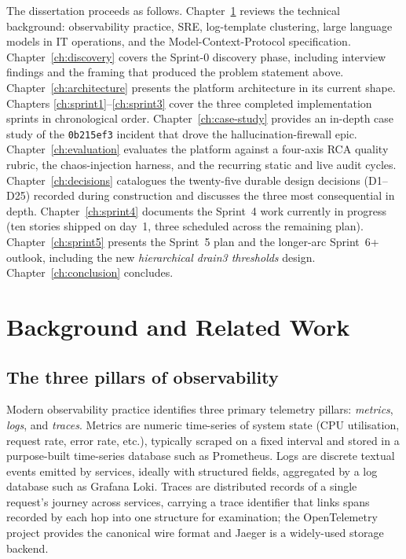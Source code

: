 \documentclass[11pt,a4paper,oneside]{report}
\begin{document}
The dissertation proceeds as follows.  Chapter~\ref{ch:background}
reviews the technical background: observability practice, SRE,
log-template clustering, large language models in IT operations, and
the Model-Context-Protocol specification.  Chapter~\ref{ch:discovery}
covers the Sprint-0 discovery phase, including interview findings and
the framing that produced the problem statement above.
Chapter~\ref{ch:architecture} presents the platform architecture in
its current shape.  Chapters \ref{ch:sprint1}--\ref{ch:sprint3} cover
the three completed implementation sprints in chronological order.
Chapter~\ref{ch:case-study} provides an in-depth case study of the
\texttt{0b215ef3} incident that drove the hallucination-firewall
epic.  Chapter~\ref{ch:evaluation} evaluates the platform against a
four-axis RCA quality rubric, the chaos-injection harness, and the
recurring static and live audit cycles.  Chapter~\ref{ch:decisions}
catalogues the twenty-five durable design decisions (D1--D25)
recorded during construction and discusses the three most consequential
in depth.  Chapter~\ref{ch:sprint4} documents the Sprint~4 work
currently in progress (ten stories shipped on day~1, three
scheduled across the remaining plan).  Chapter~\ref{ch:sprint5}
presents the Sprint~5 plan and the longer-arc Sprint~6+ outlook,
including the new \emph{hierarchical drain3 thresholds} design.
Chapter~\ref{ch:conclusion} concludes.

\chapter{Background and Related Work}
\label{ch:background}

\section{The three pillars of observability}

Modern observability practice identifies three primary telemetry
pillars: \emph{metrics}, \emph{logs}, and \emph{traces}.  Metrics are
numeric time-series of system state (CPU utilisation, request rate,
error rate, etc.), typically scraped on a fixed interval and stored in
a purpose-built time-series database such as Prometheus.  Logs are
discrete textual events emitted by services, ideally with structured
fields, aggregated by a log database such as Grafana Loki.  Traces are
distributed records of a single request's journey across services,
carrying a trace identifier that links spans recorded by each hop into
one structure for examination; the OpenTelemetry project provides the
canonical wire format and Jaeger is a widely-used storage backend.
\end{document}
